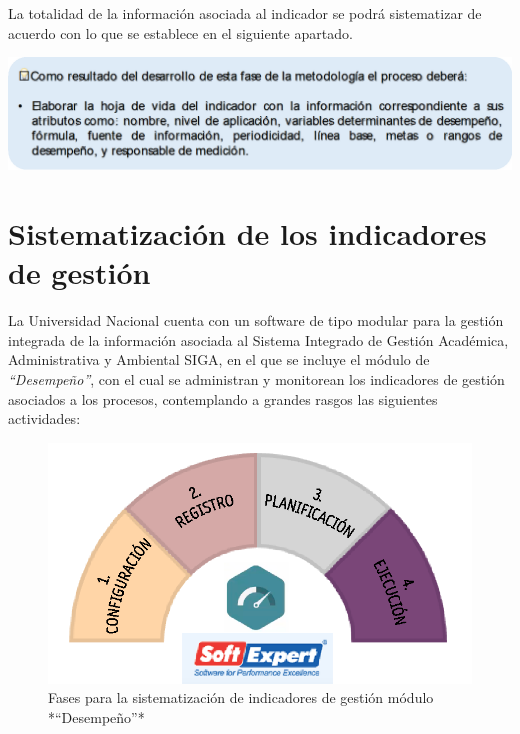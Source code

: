 \documentclass[
]{book}
\begin{document}
La totalidad de la información asociada al indicador se podrá sistematizar de acuerdo con lo que se establece en el siguiente apartado.

\begin{center}\includegraphics[width=0.8\linewidth]{Imagenes/texto_5} \end{center}

\hypertarget{sistematizaciuxf3n-de-los-indicadores-de-gestiuxf3n}{%
\chapter{Sistematización de los indicadores de gestión}\label{sistematizaciuxf3n-de-los-indicadores-de-gestiuxf3n}}

La Universidad Nacional cuenta con un software de tipo modular para la gestión integrada de la información asociada al Sistema Integrado de Gestión Académica, Administrativa y Ambiental SIGA, en el que se incluye el módulo de \emph{``Desempeño''}, con el cual se administran y monitorean los indicadores de gestión asociados a los procesos, contemplando a grandes rasgos las siguientes actividades:

\begin{figure}

{\centering \includegraphics[width=0.7\linewidth]{Imagenes/figura_17a} 

}

\caption{Fases para la sistematización de indicadores de gestión módulo *“Desempeño”*}\label{fig:unnamed-chunk-15}
\end{figure}
\end{document}
